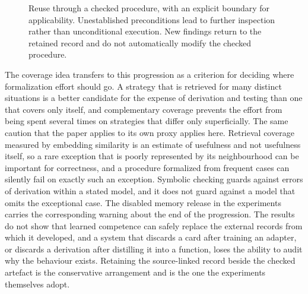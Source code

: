 \documentclass[11pt]{article}
\theoremstyle{remark}
\begin{document}
\begin{figure}[tbp]
\centering
{}
\caption{Reuse through a checked procedure, with an explicit boundary for applicability. Unestablished preconditions lead to further inspection rather than unconditional execution. New findings return to the retained record and do not automatically modify the checked procedure.}
\label{fig:checked-reuse}
\end{figure}

The coverage idea transfers to this progression as a criterion for deciding where formalization effort should go. A strategy that is retrieved for many distinct situations is a better candidate for the expense of derivation and testing than one that covers only itself, and complementary coverage prevents the effort from being spent several times on strategies that differ only superficially. The same caution that the paper applies to its own proxy applies here. Retrieval coverage measured by embedding similarity is an estimate of usefulness and not usefulness itself, so a rare exception that is poorly represented by its neighbourhood can be important for correctness, and a procedure formalized from frequent cases can silently fail on exactly such an exception. Symbolic checking guards against errors of derivation within a stated model, and it does not guard against a model that omits the exceptional case. The disabled memory release in the experiments carries the corresponding warning about the end of the progression. The results do not show that learned competence can safely replace the external records from which it developed, and a system that discards a card after training an adapter, or discards a derivation after distilling it into a function, loses the ability to audit why the behaviour exists. Retaining the source-linked record beside the checked artefact is the conservative arrangement and is the one the experiments themselves adopt.
\end{document}
